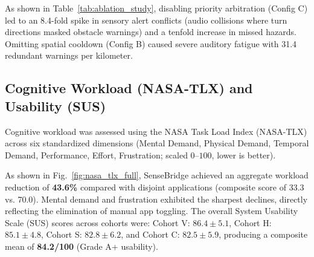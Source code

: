\documentclass[conference]{IEEEtran}
\begin{document}
As shown in Table~\ref{tab:ablation_study}, disabling priority arbitration (Config C) led to an 8.4-fold spike in sensory alert conflicts (audio collisions where turn directions masked obstacle warnings) and a tenfold increase in missed hazards. Omitting spatial cooldown (Config B) caused severe auditory fatigue with 31.4 redundant warnings per kilometer.

\begin{table}[htbp]
\caption{Ablation Study: Sensory Conflicts, Alert Density, and Reaction Latency}
\label{tab:ablation_study}
\centering
{}
\end{table}

\subsection{Cognitive Workload (NASA-TLX) and Usability (SUS)}
Cognitive workload was assessed using the NASA Task Load Index (NASA-TLX) across six standardized dimensions (Mental Demand, Physical Demand, Temporal Demand, Performance, Effort, Frustration; scaled $0$--$100$, lower is better). 

As shown in Fig.~\ref{fig:nasa_tlx_full}, SenseBridge achieved an aggregate workload reduction of \textbf{43.6\%} compared with disjoint applications (composite score of 33.3 vs. 70.0). Mental demand and frustration exhibited the sharpest declines, directly reflecting the elimination of manual app toggling. The overall System Usability Scale (SUS) scores across cohorts were: Cohort V: $86.4\pm 5.1$, Cohort H: $85.1\pm 4.8$, Cohort S: $82.8\pm 6.2$, and Cohort C: $82.5\pm 5.9$, producing a composite mean of \textbf{84.2/100} (Grade A+ usability).
\end{document}

